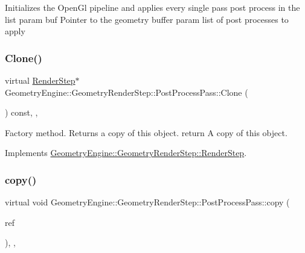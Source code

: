 Initializes the Open\+Gl pipeline and applies every single pass post process in the list param buf Pointer to the geometry buffer param list of post processes to apply \mbox{\label{class_geometry_engine_1_1_geometry_render_step_1_1_post_process_pass_afcf20dc0a20cf1e0fb730c7b56071c26}} 
\subsubsection{\texorpdfstring{Clone()}{Clone()}}
{\footnotesize\ttfamily virtual \mbox{\hyperlink{class_geometry_engine_1_1_geometry_render_step_1_1_render_step}{Render\+Step}}$\ast$ Geometry\+Engine\+::\+Geometry\+Render\+Step\+::\+Post\+Process\+Pass\+::\+Clone (\begin{DoxyParamCaption}{ }\end{DoxyParamCaption}) const\hspace{0.3cm}{\ttfamily [inline]}, {\ttfamily [override]}, {\ttfamily [virtual]}}

Factory method. Returns a copy of this object. return A copy of this object. 

Implements \mbox{\hyperlink{class_geometry_engine_1_1_geometry_render_step_1_1_render_step_afe33ea9d82c5be11f55af7d39691d44b}{Geometry\+Engine\+::\+Geometry\+Render\+Step\+::\+Render\+Step}}.

\mbox{\label{class_geometry_engine_1_1_geometry_render_step_1_1_post_process_pass_a5279399395c18ac4ef35fa3028aa4950}} 
\subsubsection{\texorpdfstring{copy()}{copy()}}
{\footnotesize\ttfamily virtual void Geometry\+Engine\+::\+Geometry\+Render\+Step\+::\+Post\+Process\+Pass\+::copy (\begin{DoxyParamCaption}\item[{const \mbox{\hyperlink{class_geometry_engine_1_1_geometry_render_step_1_1_post_process_pass}{Post\+Process\+Pass}} \&}]{ref }\end{DoxyParamCaption})\hspace{0.3cm}{\ttfamily [inline]}, {\ttfamily [protected]}, {\ttfamily [virtual]}}

